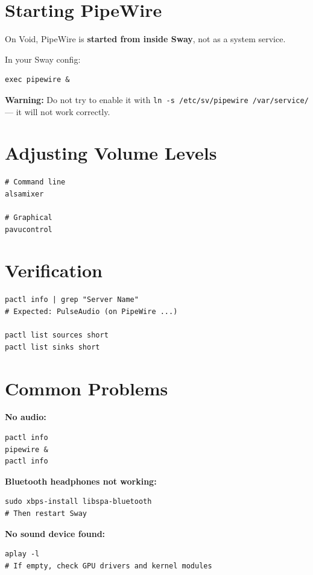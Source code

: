 \documentclass[12pt, a4paper]{book}
\begin{document}
\section{Starting PipeWire}

On Void, PipeWire is \textbf{started from inside Sway}, not as a system service.

In your Sway config:
\begin{lstlisting}
exec pipewire &
\end{lstlisting}

\begin{warningbox}
\textbf{Warning:} Do not try to enable it with \texttt{ln -s /etc/sv/pipewire /var/service/} --- it will not work correctly.
\end{warningbox}

\section{Adjusting Volume Levels}
\begin{lstlisting}
# Command line
alsamixer

# Graphical
pavucontrol
\end{lstlisting}

\section{Verification}
\begin{lstlisting}
pactl info | grep "Server Name"
# Expected: PulseAudio (on PipeWire ...)

pactl list sources short
pactl list sinks short
\end{lstlisting}

\section{Common Problems}

\textbf{No audio:}
\begin{lstlisting}
pactl info
pipewire &
pactl info
\end{lstlisting}

\textbf{Bluetooth headphones not working:}
\begin{lstlisting}
sudo xbps-install libspa-bluetooth
# Then restart Sway
\end{lstlisting}

\textbf{No sound device found:}
\begin{lstlisting}
aplay -l
# If empty, check GPU drivers and kernel modules
\end{lstlisting}
\end{document}
